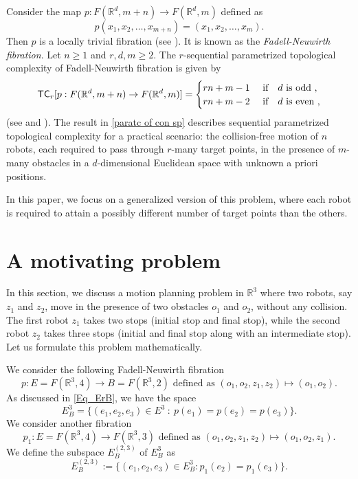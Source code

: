\documentclass[12pt,oneside,reqno]{amsart}
\theoremstyle{plain}
\theoremstyle{definition}
\theoremstyle{remark}
\newcommand{\sect}{\setcounter{figure}{0}\section}
\newcommand{\TC}{{\sf {TC}}}
\newcommand{\rr}{{\mathbb {R}}}
\begin{document}
Consider the map $p: F(\rr^d, m+n)\to F(\rr^d, m)$ defined as $$p(x_1, x_2,\ldots, x_{m+n}) = (x_1,x_2,\ldots,x_m).$$
Then $p$ is a locally trivial fibration (see \cite{FadN62}). It is known as the \emph{Fadell-Neuwirth fibration}. Let $n\geq 1$ and $r,d,m\geq 2$. The $r$-sequential parametrized topological complexity of Fadell-Neuwirth fibration is given by
\begin{equation}\label{paratc of con sp}
\TC_r[p: F(\rr^d, m+n) \to F(\rr^d, m)] = 
\begin{cases}
rn+m-1 & \mbox{ if } ~~ d \mbox{ is odd },\\
rn+m-2 &\mbox{ if } ~~ d \mbox{ is even },
\end{cases}
\end{equation}
(see \cite{FarP22} and \cite{FarP23}).
The result in \eqref{paratc of con sp} describes sequential parametrized topological complexity for a practical scenario: the collision-free motion of $n$ robots, each required to pass through $r$-many target points, in the presence of $m$-many obstacles in a $d$-dimensional Euclidean space with unknown a priori positions. 

In this paper, we focus on a generalized version of this problem, where each robot is required to attain a possibly different number of target points than the others.



\sect{A motivating problem}\label{sec:problem}

In this section, we discuss a motion planning problem in $\mathbb{R}^3$ where two robots, say $z_1$ and $z_2$, move in the presence of two obstacles $o_1$ and $o_2$, without any collision. The first robot $z_1$ takes two stops (initial stop and final stop), while the second robot $z_2$ takes three stops (initial and final stop along with an intermediate stop). Let us formulate this problem mathematically. 

We consider the following Fadell-Neuwirth fibration
\begin{equation}\label{Eq_fibsec example}
p: E=F(\rr^3, 4) \to B=F(\rr^3, 2) \text{ defined as } (o_1, o_2, z_1, z_2)\mapsto (o_1, o_2).
\end{equation}
As discussed in \eqref{Eq_ErB}, we have the space $$E^3_B=\{(e_1, e_2, e_3)\in E^3 ~ \colon  ~p(e_1)=p(e_2)=p(e_3)\}.$$ 
We consider another fibration \begin{equation}\label{eq_p1_example}
 p_1: E=F(\rr^3, 4) \to F(\rr^3, 3) \text{ defined as } (o_1, o_2, z_1, z_2)\mapsto (o_1, o_2, z_1).
 \end{equation}
We define the subspace $E_B^{(2, 3)}$ of $E^3_B$ as
\begin{equation}\label{Eq_E23B}
E_B^{(2, 3)}:=\{(e_1, e_2, e_3)\in E^3_B :  p_1(e_2)=p_1(e_3)\}.
\end{equation}
\end{document}

